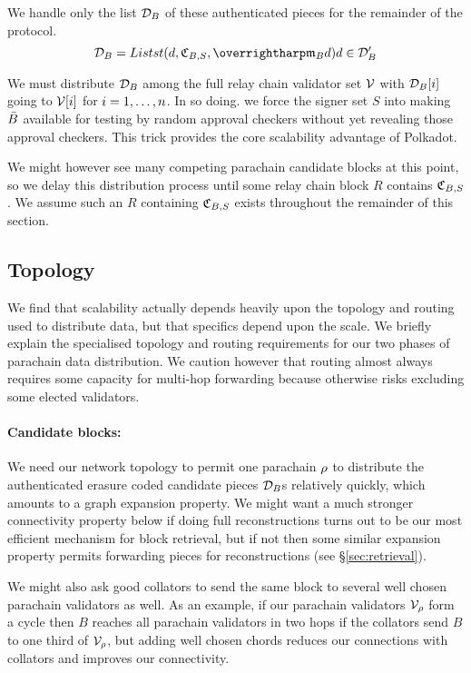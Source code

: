 We handle only the list $\mathcal{D}_B$ of these authenticated pieces for the remainder of the protocol. 
$$ \pieces_B = Listst{ (d,\receipt_{B,S},\vect{\merkleroot_B d}) }{ d \in \prepieces_B } $$

We must distribute $\mathcal{D}_B$ among the full relay chain validator set $\mathcal{V}$ with $\mathcal{D}_B[i]$ going to $\mathcal{V}[i]$ for $i = 1,\ldots,n$.  In so doing. we force the signer set $S$ into making $\bar{B}$ available for testing by random approval checkers without yet revealing those approval checkers.  This trick provides the core scalability advantage of Polkadot.

We might however see many competing parachain candidate blocks at this point, so we delay this distribution process until some relay chain block $R$ contains $\mathfrak{C}_{B,S}$.  We assume such an $R$ containing $\mathfrak{C}_{B,S}$ exists throughout the remainder of this section.


\subsection{Topology}
\label{sec:topology}

We find that scalability actually depends heavily upon the topology and routing used to distribute data, but that specifics depend upon the scale.  We briefly explain the specialised topology and routing requirements for our two phases of parachain data distribution.  We caution however that routing almost always requires some capacity for multi-hop forwarding because otherwise risks excluding some elected validators.  

\smallskip
\paragraph{Candidate blocks:}

We need our network topology to permit one parachain $\rho$ to distribute the authenticated erasure coded candidate pieces $\mathcal{D}_B$s relatively quickly, which amounts to a graph expansion property.  We might want a much stronger connectivity property below if doing full reconstructions turns out to be our most efficient mechanism for block retrieval, but if not then some similar expansion property permits forwarding pieces for reconstructions (see \S\ref{sec:retrieval}).

We might also ask good collators to send the same block to several well chosen parachain validators as well.  As an example, if our parachain validators $\mathcal{V}_{\rho}$ form a cycle then $B$ reaches all parachain validators in two hops if the collators send $B$ to one third of $\mathcal{V}_{\rho}$, but adding well chosen chords reduces our connections with collators and improves our connectivity.  

